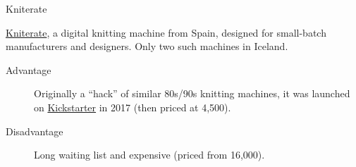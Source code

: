 \documentclass[
    NAME={Dr. Helga Ingimundardóttir},
    EMAIL={helgaingim@hi.is},
    FACULTY={Industrial Engineering},
    TITLE={HiDef Textiles: Reviving Tradition with Innovation},
    SUBTITLE={Empowering Creativity and Sustainability in Textile Production through Digital Transformation},
    SEMINAR={Reykjavík DataBeers},
    DATE={January 25, 2025},
    WIDE={true}
]{HI-LaTeX/hi-beamer}
\begin{document}
\begin{frame}{Kniterate}

    \href{https://www.kniterate.com/product/kniterate-the-digital-knitting-machine/}{Kniterate}, a digital knitting machine from Spain, designed for small-batch manufacturers and designers. Only two such machines in Iceland.

    \begin{description}
        \item[Advantage] Originally a ``hack'' of similar 80s/90s knitting machines, it was launched on \href{https://www.kickstarter.com/projects/kniterate/kniterate-the-digital-knitting-machine/}{Kickstarter} in 2017 (then priced at \texteuro{}4,500).
        \item[Disadvantage] Long waiting list and expensive (priced from \texteuro{}16,000).
    \end{description}


\end{frame}
\end{document}
